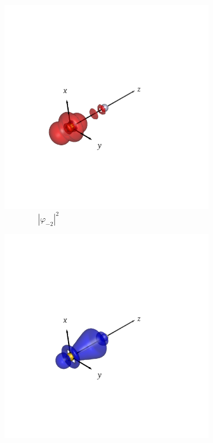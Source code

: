 \documentclass[journal=inoraj,manuscript=article]{achemso}
\begin{document}
\begin{figure}[!h]
    \vspace{0.0cm}
    \begin{subfigure}[t]{0.30\textwidth}
        \centering
        \includegraphics[width=\linewidth]{./AuHg+/nocv-3.png}
        \caption*{\ \ \ \ \ \ \ \ $|\varphi_{-2}|^2$}
    \end{subfigure}
    \hfill
    \begin{subfigure}[t]{0.30\textwidth}
        \centering
        \includegraphics[width=\linewidth]{./AuHg+/nocv+3.png}

\end{subfigure}
\end{figure}
\end{document}
